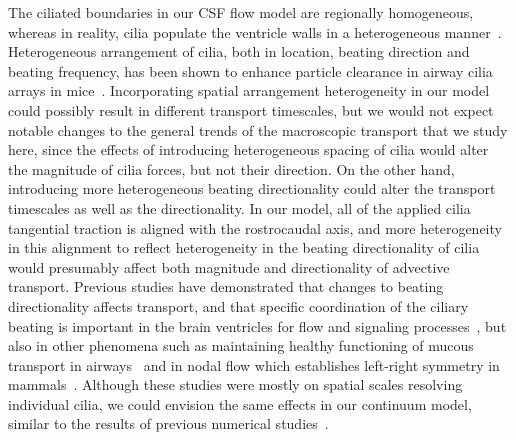 \documentclass{WileyMSP-template}
\begin{document}
The ciliated boundaries in our CSF flow model are regionally homogeneous,
whereas in reality, cilia populate the ventricle walls in a
heterogeneous manner~\cite{Olstad2019CiliaryDevelopment}. Heterogeneous
arrangement of cilia, both in location, beating direction and beating frequency,
has been shown to enhance particle clearance in airway cilia arrays
in mice~\cite{Ramirez-SanJuan2020Multi-scaleArrays}.
Incorporating spatial arrangement heterogeneity in our model could possibly
result in different transport timescales,
but we would not expect notable changes to the general trends of the macroscopic
transport that we study here, since the effects of introducing heterogeneous spacing
of cilia would alter the magnitude of cilia forces, but not their direction.
On the other hand, introducing more heterogeneous beating directionality could
alter the transport timescales as well as the directionality.
In our model, all of the applied cilia
tangential traction is aligned with the rostrocaudal axis, and more heterogeneity
in this alignment to reflect heterogeneity in the beating directionality of
cilia would presumably affect both magnitude and directionality of advective transport.
Previous studies have demonstrated that changes to beating directionality affects transport,
and that specific coordination of the ciliary beating is important in the brain ventricles for
flow and signaling processes~\cite{Eichele2020Cilia-drivenVentricle, Olstad2019CiliaryDevelopment,
Faubel2016Cilia-basedVentricles, Guirao2010CouplingCilia, Afzelius2004CiliaRelatedDiseases},
but also in other phenomena such as maintaining healthy functioning of mucous transport in
airways~\cite{Rayner1996CiliarySyndrome, Schneiter2021Multi-scaleFunction,
Bustamante-Marin2019LackClearance, Tsukita2012CoordinatedFeet} and in nodal flow which establishes
left-right symmetry in mammals~\cite{Yoshiba2014RolesSymmetry, Hirokawa2006NodalAsymmetry,
Sawamoto2006NewBrain}.
Although these studies were mostly on spatial scales resolving individual cilia,
we could envision the same effects in our continuum model,
similar to the results of previous numerical studies~\cite{Ramirez-SanJuan2020Multi-scaleArrays,
Thouvenin2020OriginCanal, Yoshida2022EffectVentricles}. 
\end{document}
